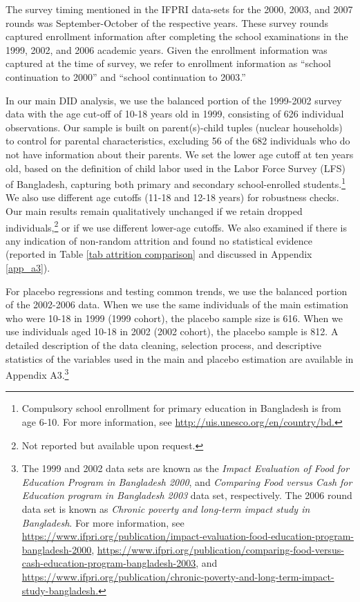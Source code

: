 \documentclass[12pt,letterpaper]{article}
\newcommand{\0}{\ensuremath{\mbox{\boldmath $0$}}}
\begin{document}
The survey timing mentioned in the IFPRI data-sets for the 2000, 2003, and 2007 rounds was September-October of the respective years. These survey rounds captured enrollment information after completing the school examinations in the 1999, 2002, and 2006 academic years. Given the enrollment information was captured at the time of survey, we refer to enrollment information as ``school continuation to 2000'' and ``school continuation to 2003.''

In our main DID analysis, we use the balanced portion of the 1999-2002 survey data with the age cut-off of 10-18 years old in 1999, consisting of 626 individual observations. Our sample is built on parent(s)-child tuples (nuclear households) to control for parental characteristics, excluding 56 of the 682 individuals who do not have information about their parents. We set the lower age cutoff at ten years old, based on the definition of child labor used in the Labor Force Survey (LFS) of Bangladesh, capturing both primary and secondary school-enrolled students.\footnote{Compulsory school enrollment for primary education in Bangladesh is from age 6-10. For more information, see \url{http://uis.unesco.org/en/country/bd.} } We also use different age cutoffs (11-18 and 12-18 years) for robustness checks. Our main results remain qualitatively unchanged if we retain dropped individuals,\footnote{Not reported but available upon request.} or if we use different lower-age cutoffs. We also examined if there is any indication of non-random attrition and found no statistical evidence (reported in Table \ref{tab attrition comparison} and discussed in Appendix \ref{app_a3}).

For placebo regressions and testing common trends, we use the balanced portion of the 2002-2006 data. When we use the same individuals of the main estimation who were 10-18 in 1999 (1999 cohort), the placebo sample size is 616. When we use individuals aged 10-18 in 2002 (2002 cohort), the placebo sample is 812. A detailed description of the data cleaning, selection process, and descriptive statistics of the variables used in the main and placebo estimation are available in Appendix A3.\footnote{The 1999 and 2002 data sets are known as the \textit{Impact Evaluation of Food for Education Program in Bangladesh 2000}, and \textit{Comparing Food versus Cash for Education program in Bangladesh 2003} data set, respectively. The 2006 round data set is known as \textit{Chronic poverty and long-term impact study in Bangladesh}. For more information, see \url{https://www.ifpri.org/publication/impact-evaluation-food-education-program-bangladesh-2000}, \url{https://www.ifpri.org/publication/comparing-food-versus-cash-education-program-bangladesh-2003}, and \url{https://www.ifpri.org/publication/chronic-poverty-and-long-term-impact-study-bangladesh.} }
\end{document}
